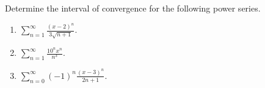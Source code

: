 Determine the interval of convergence for the following power series. 
\begin{enumerate}[ref={\fcProblemRef}]
\item $\displaystyle \sum_{n=1}^{\infty} \frac{(x-2)^n}{3\sqrt{n+1}}.$
\answer{$x\in [1, 3)$}
\item $\displaystyle \sum \limits_{n= 1}^{\infty} \frac{ 10^nx^n}{n^3}$.
\item $\displaystyle \sum\limits_{n=0}^{\infty}(-1)^n \frac{(x- 3)^n }{ 2n+1} $.
\answer{$x\in (2, 4]$}
\end{enumerate}